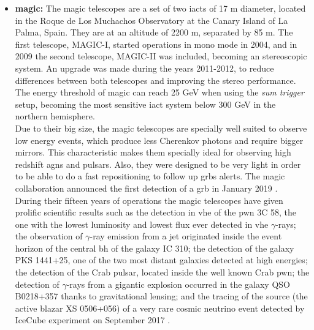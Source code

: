 \documentclass[main.tex]{subfiles}
\begin{document}
\begin{itemize}
    \item \textbf{\gls{magic}:} The \gls{magic} telescopes are a set of two \glspl{iact} of 17 m diameter, located in the Roque de Los Muchachos Observatory at the Canary Island of La Palma, Spain. They are at an altitude of 2200 m, separated by 85 m. The first telescope, MAGIC-I, started operations in mono mode in 2004, and in 2009 the second telescope, MAGIC-II was included, becoming an stereoscopic system. An upgrade was made during the years 2011-2012, to reduce differences between both telescopes and improving the stereo performance.\\
    The energy threshold of \gls{magic} can reach 25 GeV when using the \textit{sum trigger} setup, becoming the most sensitive \gls{iact} system below 300 GeV in the northern hemisphere.\\
    Due to their big size, the \gls{magic} telescopes are specially well suited to observe low energy events, which produce less Cherenkov photons and require bigger mirrors. This characteristic makes them specially ideal for observing high redshift \glspl{agn} and pulsars. Also, they were designed to be very light in order to be able to do a fast repositioning to follow up \glspl{grb} alerts. The \gls{magic} collaboration announced the first detection of a \gls{grb} in January 2019 \cite{2019MAGICGRB}.\\
    During their fifteen years of operations the \gls{magic} telescopes have given prolific scientific results such as the detection in \gls{vhe} of the \gls{pwn} 3C 58, the one with the lowest luminosity and lowest flux ever detected in \gls{vhe} $\gamma$-rays; the observation of $\gamma$-ray emission from a jet originated inside the event horizon of the central \gls{bh} of the galaxy IC 310; the detection of the galaxy PKS 1441+25, one of the two most distant galaxies detected at high energies; the detection of the Crab pulsar, located inside the well known Crab \gls{pwn}; the detection of $\gamma$-rays from a gigantic explosion occurred in the galaxy QSO B0218+357 thanks to gravitational lensing; and the tracing of the source (the active blazar XS 0506+056) of a very rare cosmic neutrino event detected by IceCube experiment on September 2017 \cite{MAGICweb}. \\
    

\end{itemize}
\end{document}
